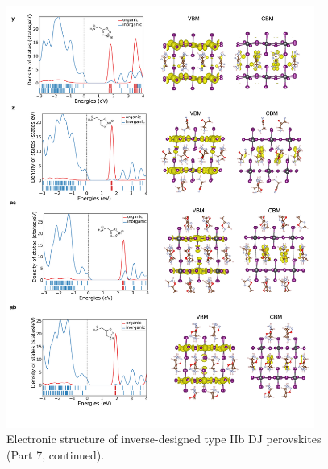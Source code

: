 \begin{figure}[htbp]
    \ContinuedFloat
    \centering
    \includegraphics[width=0.9\textwidth]{figures/synthesis-feasibility/figure5-25-7.png}
    \caption{Electronic structure of inverse-designed type IIb DJ perovskites (Part 7, continued).}
\end{figure}

